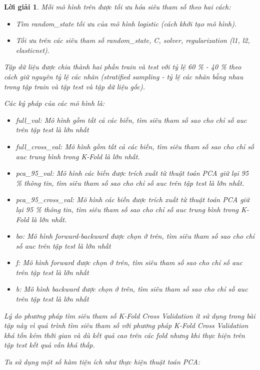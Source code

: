 \documentclass[14pt, a4paper]{article}
\theoremstyle{sltheorem}
\theoremstyle{soltheorem}
\newtheorem*{loigiai}{Lời giải}
\begin{document}
\begin{loigiai}
    Mỗi mô hình trên được tối ưu hóa siêu tham số theo hai cách:

    \begin{itemize}
        \item Tìm random\_state tối ưu của mô hình logistic (cách khởi tạo mô hình).
        \item Tối ưu trên các siêu tham số random\_state, C, solver, regularization (l1, l2, elasticnet).
    \end{itemize}

    Tập dữ liệu được chia thành hai phần train và test với tỷ lệ 60 \% - 40 \% theo cách giữ nguyên tỷ lệ các nhãn (stratified sampling - tỷ lệ các nhãn bằng nhau trong tập train và tập test và tập dữ liệu gốc).
    
    Các ký pháp của các mô hình là:

    \begin{itemize}
        \item full\_val: Mô hình gồm tất cả các biến, tìm siêu tham số sao cho chỉ số auc trên tập test là lớn nhất
        \item full\_cross\_val: Mô hình gồm tất cả các biến, tìm siêu tham số sao cho chỉ số auc trung bình trong K-Fold là lớn nhất.
        \item pca\_95\_val: Mô hình các biến được trích xuất từ thuật toán PCA giữ lại 95 \% thông tin, tìm siêu tham số sao cho chỉ số auc trên tập test là lớn nhất.
        \item pca\_95\_cross\_val: Mô hình các biến được trích xuất từ thuật toán PCA giữ lại 95 \% thông tin, tìm siêu tham số sao cho chỉ số auc trung bình trong K-Fold là lớn nhất.
        \item bo: Mô hình forward-backward được chọn ở trên, tìm siêu tham số sao cho chỉ số auc trên tập test là lớn nhất
        \item f: Mô hình forward được chọn ở trên, tìm siêu tham số sao cho chỉ số auc trên tập test là lớn nhất
        \item b: Mô hình backward được chọn ở trên, tìm siêu tham số sao cho chỉ số auc trên tập test là lớn nhất
    \end{itemize}

    Lý do phương pháp tìm siêu tham số K-Fold Cross Validation ít sử dụng trong bài tập này vì quá trình tìm siêu tham số với phương pháp K-Fold Cross Validation khá tốn kém thời gian và dù kết quả cao trên các fold nhưng khi thực hiện trên tập test kết quả vẫn khá thấp.

    Ta sử dụng một số hàm tiện ích như thực hiện thuật toán PCA:


\end{loigiai}
\end{document}

